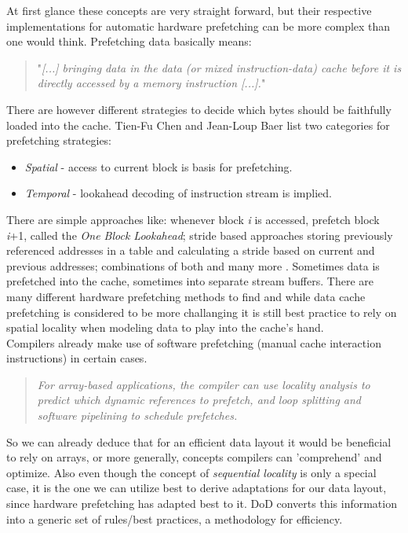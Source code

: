 At first glance these concepts are very straight forward, but their respective implementations for automatic hardware prefetching can be more complex than one would think. Prefetching data basically means:
\begin{quote}
"\textit{[...] bringing data in the data (or mixed instruction-data) cache before it is directly accessed by a memory instruction [...].}" 
\end{quote}
There are however different strategies to decide which bytes should be faithfully loaded into the cache. Tien-Fu Chen and Jean-Loup Baer list two categories for prefetching strategies: 
\begin{itemize}
	\item \textit{Spatial} - access to current block is basis for prefetching.
	\item \textit{Temporal} - lookahead decoding of instruction stream is implied.
\end{itemize}
There are simple approaches like: whenever block \textit{i} is accessed, prefetch block \textit{i}+1, called the \textit{One Block Lookahead}; stride based approaches storing previously referenced addresses in a table and calculating a stride based on current and previous addresses; combinations of both and many more .  Sometimes data is prefetched into the cache, sometimes into separate stream buffers. There are many different hardware prefetching methods to find and while data cache prefetching is considered to be more challanging  it is still best practice to rely on spatial locality when modeling data to play into the cache's hand.\\
Compilers already make use of software prefetching (manual cache interaction instructions) in certain cases.
\begin{quote}
	\textit{For array-based applications, the compiler can use locality analysis to predict which dynamic references to prefetch, and loop splitting and software pipelining to schedule prefetches.} 
\end{quote}
So we can already deduce that for an efficient data layout it would be beneficial to rely on arrays, or more generally, concepts compilers can 'comprehend' and optimize. Also even though the concept of \textit{sequential locality} is only a special case, it is the one we can utilize best to derive adaptations for our data layout, since hardware prefetching has adapted best to it. DoD converts this information into a generic set of rules/best practices, a methodology for efficiency.


